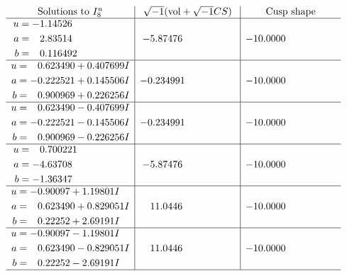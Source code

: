 \documentclass[1p]{elsarticle_modified}
\theoremstyle{definition}
\newcommand{\I}{\sqrt{-1}}
\begin{document}
$$\begin{array}{c|c|c}  
\text{Solutions to }I^u_{8}& \I (\text{vol} + \sqrt{-1}CS) & \text{Cusp shape}\\
 \hline 
\begin{aligned}
u &= -1.14526\phantom{ +0.000000I} \\
a &= \phantom{-}2.83514\phantom{ +0.000000I} \\
b &= \phantom{-}0.116492\phantom{ +0.000000I}\end{aligned}
 & -5.87476\phantom{ +0.000000I} & -10.0000\phantom{ +0.000000I} \\ \hline\begin{aligned}
u &= \phantom{-}0.623490 + 0.407699 I \\
a &= -0.222521 + 0.145506 I \\
b &= \phantom{-}0.900969 + 0.226256 I\end{aligned}
 & -0.234991\phantom{ +0.000000I} & -10.0000\phantom{ +0.000000I} \\ \hline\begin{aligned}
u &= \phantom{-}0.623490 - 0.407699 I \\
a &= -0.222521 - 0.145506 I \\
b &= \phantom{-}0.900969 - 0.226256 I\end{aligned}
 & -0.234991\phantom{ +0.000000I} & -10.0000\phantom{ +0.000000I} \\ \hline\begin{aligned}
u &= \phantom{-}0.700221\phantom{ +0.000000I} \\
a &= -4.63708\phantom{ +0.000000I} \\
b &= -1.36347\phantom{ +0.000000I}\end{aligned}
 & -5.87476\phantom{ +0.000000I} & -10.0000\phantom{ +0.000000I} \\ \hline\begin{aligned}
u &= -0.90097 + 1.19801 I \\
a &= \phantom{-}0.623490 + 0.829051 I \\
b &= \phantom{-}0.22252 + 2.69191 I\end{aligned}
 & \phantom{-}11.0446\phantom{ +0.000000I} & -10.0000\phantom{ +0.000000I} \\ \hline\begin{aligned}
u &= -0.90097 - 1.19801 I \\
a &= \phantom{-}0.623490 - 0.829051 I \\
b &= \phantom{-}0.22252 - 2.69191 I\end{aligned}
 & \phantom{-}11.0446\phantom{ +0.000000I} & -10.0000\phantom{ +0.000000I}\\
 \hline 
 \end{array}$$\newpage\newpage\renewcommand{\arraystretch}{1}
\end{document}

